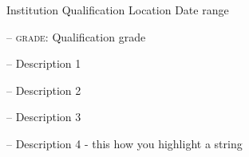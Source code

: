
\begin{cventries}
\vspace{-12mm} %
    \cventry
    {Institution} %
    {Qualification} %
    {Location} %
    {Date range} %
    {
      \begin{cvitems} %
        \item[--] \textsc{grade}: Qualification grade
        \item[--] Description 1
        \item[--] Description 2
        \item[--] Description 3
        \item[--] Description 4 - this how you \textcolor{awesome}{highlight a string}
      \end{cvitems}
    }

\end{cventries}
